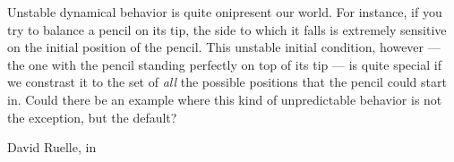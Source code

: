 \documentclass[../main]{subfiles}
\begin{document}
Unstable dynamical behavior is quite onipresent our world. For instance, if you try to balance a pencil on its tip, the side to which it falls is extremely sensitive on the initial position of the pencil. This unstable initial condition, however --- the one with the pencil standing perfectly on top of its tip --- is quite special if we constrast it to the set of \emph{all} the possible positions that the pencil could start in. Could there be an example where this kind of unpredictable behavior is not the exception, but the default?

David Ruelle, in
\end{document}
